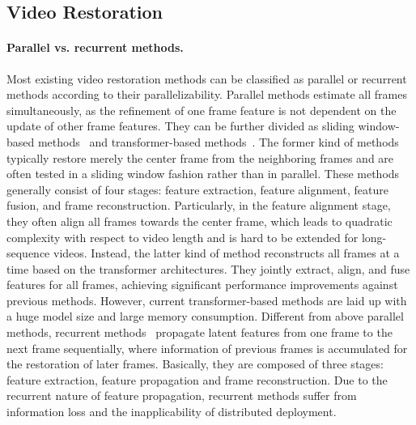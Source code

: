 \documentclass{article}
\newlength \g
\begin{document}
\subsection{Video Restoration}
\paragraph{Parallel vs. recurrent methods.} Most existing video restoration methods can be classified as parallel or recurrent methods according to their parallelizability. Parallel methods estimate all frames simultaneously, as the refinement of one frame feature is not dependent on the update of other frame features. They can be further divided as sliding window-based methods~\cite{caballero2017VESPCN,huang2017video,wang2019edvr,tassano2019dvdnet,tian2020tdan,wang2020deep,li2020mucan,su2017dvddeblur,zhou2019spatio,zhou2019spatio,isobe2020tga,tassano2020fastdvdnet,sheth2021unsupervised,li2021arvo} and transformer-based methods~\cite{cao2021videosr,liang2022vrt}. The former kind of methods typically restore merely the center frame from the neighboring frames and are often tested in a sliding window fashion rather than in parallel. These methods generally consist of four stages: feature extraction, feature alignment, feature fusion, and frame reconstruction. Particularly, in the feature alignment stage, they often align all frames towards the center frame, which leads to quadratic complexity with respect to video length and is hard to be extended for long-sequence videos. Instead, the latter kind of method reconstructs all frames at a time based on the transformer architectures. They jointly extract, align, and fuse features for all frames, achieving significant performance improvements against previous methods. However, current transformer-based methods are laid up with a huge model size and large memory consumption. Different from above parallel methods, recurrent methods~\cite{huang2015bidirectional,sajjadi2018FRVSR,fuoli2019rlsp,haris2019RBPN,xiang2020zooming,isobe2020rsdn,isobe2020rrn,chan2021basicvsr,chan2021basicvsr++,lin2021fdan,nah2019recurrent,zhong2020efficient,son2021recurrent,lin2022flow,cao2022towards} propagate latent features from one frame to the next frame sequentially, where information of previous frames is accumulated for the restoration of later frames. Basically, they are composed of three stages: feature extraction, feature propagation and frame reconstruction. Due to the recurrent nature of feature propagation, recurrent methods suffer from information loss and the inapplicability of distributed deployment. 
 
\end{document}
